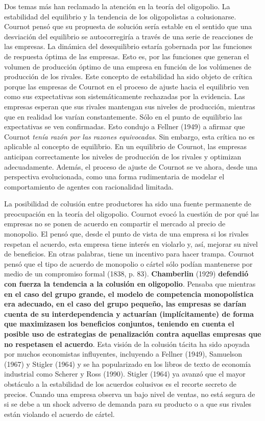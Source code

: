 \documentclass[10pt,a4paper]{article}
\begin{document}
Dos temas más han reclamado la atención en la teoría del oligopolio. La estabilidad del equilibrio y la tendencia de los oligopolistas a colusionarse. Cournot pensó que su propuesta de solución sería estable en el sentido que una desviación del equilibrio se autocorregiría a través de una serie de reacciones de las empresas. La dinámica del desequilibrio estaría gobernada por las funciones de respuesta óptima de las empresas. Esto es, por las funciones que generan el volumen de producción óptimo de una empresa en función de los volúmenes de producción de los rivales. Este concepto de estabilidad ha sido objeto de crítica porque las empresas de Cournot en el proceso de ajuste hacia el equilibrio ven como sus expectativas son sistemáticamente rechazadas por la evidencia. Las empresas esperan que sus rivales mantengan sus niveles de producción, mientras que en realidad los varían constantemente. Sólo en el punto de equilibrio las expectativas se ven confirmadas. Esto condujo a Fellner (1949) a afirmar que Cournot \textit{tenía razón por las razones equivocadas}. Sin embargo, esta crítica no es aplicable al concepto de equilibrio. En un equilibrio de Cournot, las empresas anticipan correctamente los niveles de producción de los rivales y optimizan adecuadamente. Además, el proceso de ajuste de Cournot se ve ahora, desde una perspectiva evolucionada, como una forma rudimentaria de modelar el comportamiento de agentes con racionalidad limitada. 

La posibilidad de colusión entre productores ha sido una fuente permanente de preocupación en la teoría del oligopolio. Cournot evocó la cuestión de por qué las empresas no se ponen de acuerdo en compartir el mercado al precio de monopolio. El pensó que, desde el punto de vista de una empresa si los rivales respetan el acuerdo, esta empresa tiene interés en violarlo y, así, mejorar su nivel de beneficios. En otras palabras, tiene un incentivo para hacer trampa. Cournot pensó que el tipo de acuerdo de monopolio o cártel sólo podían mantenerse por medio de un compromiso formal (1838, p. 83). \textbf{Chamberlin} (1929) \textbf{defendió con fuerza la tendencia a la colusión en oligopolio}. Pensaba que mientras \textbf{en el caso del grupo grande, el modelo de competencia monopolística era adecuado, en el caso del grupo pequeño, las empresas se darían cuenta de su interdependencia y actuarían (implícitamente) de forma que maximizasen los beneficios conjuntos, teniendo en cuenta el posible uso de estrategias de penalización contra aquellas empresas que no respetasen el acuerdo}. Esta visión de la colusión tácita ha sido apoyada por muchos economistas influyentes, incluyendo a Fellner (1949), Samuelson (1967) y Stigler (1964) y se ha popularizado en los libros de texto de economía industrial como Scherer y Ross (1990). Stigler (1964) ya avanzó que el mayor obstáculo a la estabilidad de los acuerdos colusivos es el recorte secreto de precios. Cuando una empresa observa un bajo nivel de ventas, no está segura de si se debe a un shock adverso de demanda para su producto o a que sus rivales están violando el acuerdo de cártel. 
\end{document}
